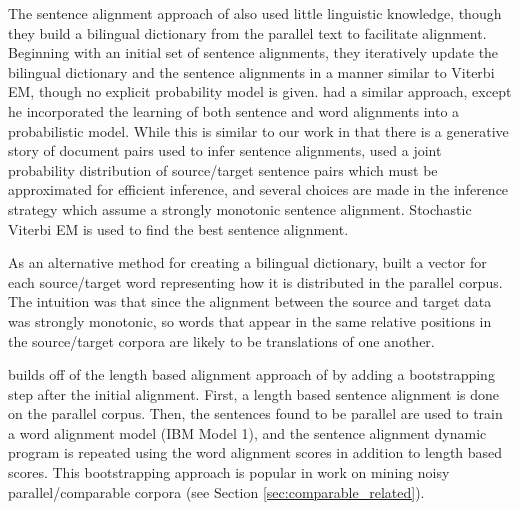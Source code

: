 The sentence alignment approach of \citet{Kay93} also used little linguistic
knowledge, though they build a bilingual dictionary from the parallel text to
facilitate alignment. Beginning with an initial set of sentence alignments, they
iteratively update the bilingual dictionary and the sentence alignments in a
manner similar to Viterbi EM, though no explicit probability model is given.
\citet{Chen93} had a similar approach, except he
incorporated the learning of both sentence and word alignments into a
probabilistic model. While this is similar to our work in that there is a
generative story of document pairs used to infer sentence alignments,
\citet{Chen93} used a joint probability distribution of source/target sentence
pairs which must be approximated for efficient inference, and several choices
are made in the inference strategy which assume a strongly monotonic sentence
alignment. Stochastic Viterbi EM is used to find the best sentence alignment.

As an alternative method for creating a bilingual dictionary, \citet{Fung94}
built a vector for each source/target word representing how it is distributed in
the parallel corpus. The intuition was that since the alignment between the
source and target data was strongly monotonic, so words that appear in the same
relative positions in the source/target corpora are likely to be translations of
one another.

\citet{Moore02} builds off of the length based alignment approach of
\citet{Gale93} by adding a bootstrapping step after the initial alignment.
First, a length based sentence alignment is done on the parallel corpus. Then,
the sentences found to be parallel are used to train a word alignment model
(IBM Model 1), and the sentence alignment dynamic program is repeated using
the word alignment scores in addition to length based scores. This bootstrapping
approach is popular in work on mining noisy parallel/comparable corpora (see
Section \ref{sec:comparable_related}).

